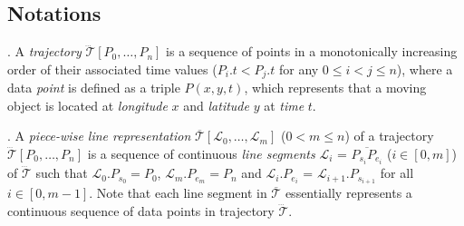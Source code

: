 \subsection{Notations}


. A \textit{trajectory} $\dddot{\mathcal{T}}\left[P_0, \ldots, P_n\right]$ is a sequence of points in a monotonically increasing order of their associated time values (\ie $P_i.t < P_j.t$ for any $0\le i<j\le n$), where a data \textit{point} is defined as a triple $P\left(x, y, t\right)$, which represents that a moving object is located at {\em longitude} $x$ and {\em latitude} $y$ at {\em time} $t$. 


\eat{%
	A \textit{line segment} (or line segment for simplicity) $\mathcal{L}$ is defined as $\overline{P_{s}P_{e}}$, which represents the closed line segment that connects the start point $P_s$ and the end point $P_e$.
	We also use $|\mathcal{L}|$ and $\mathcal{L}.\theta\in [0, 2\pi)$ to denote the length of a line segment $\mathcal{L}$, and its angle with the $x$-axis of the coordinate system $(x, y)$, where $x$ and $y$ are the longitude and latitude, respectively.
	That is, a line segment $\mathcal{L}$ = $\overline{P_{s}P_{e}}$ can be treated as a triple $(P_s, |\mathcal{L}|, \mathcal{L}.\theta)$.
}%


. A \textit{piece-wise line representation} $\overline{\mathcal{T}}\left[\mathcal{L}_0, \ldots, \mathcal{L}_m\right]$ ($0< m \le n$) of a trajectory $\dddot{\mathcal{T}}\left[P_0, \ldots, P_n\right]$ is a sequence of continuous \textit{line segments} $\mathcal{L}_{i}$ = $\overline{P_{s_i}P_{e_i}}$ ($i\in\left[0,m\right]$) of $\dddot{\mathcal{T}}$ such that $\mathcal{L}_{0}.P_{s_0} = P_0$, $\mathcal{L}_{m}.P_{e_m} = P_n$ and  $\mathcal{L}_{i}.P_{e_i}$ = $\mathcal{L}_{i+1}.P_{s_{i+1}}$ for all $i\in\left[0, m-1\right]$.
Note that each line segment in $\overline{\mathcal{T}}$ essentially represents a continuous sequence of data points in trajectory $\dddot{\mathcal{T}}$.


